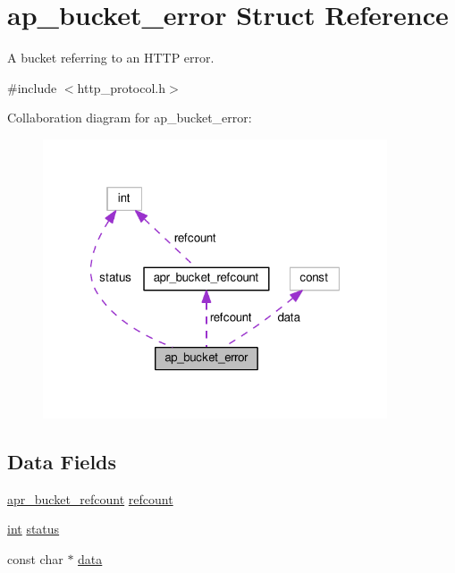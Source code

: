 \hypertarget{structap__bucket__error}{}\section{ap\+\_\+bucket\+\_\+error Struct Reference}
\label{structap__bucket__error}


A bucket referring to an H\+T\+TP error.  




{\ttfamily \#include $<$http\+\_\+protocol.\+h$>$}



Collaboration diagram for ap\+\_\+bucket\+\_\+error\+:
\nopagebreak
\begin{figure}[H]
\begin{center}
\leavevmode
\includegraphics[width=289pt]{structap__bucket__error__coll__graph}
\end{center}
\end{figure}
\subsection*{Data Fields}
\begin{DoxyCompactItemize}
\item 
\hyperlink{structapr__bucket__refcount}{apr\+\_\+bucket\+\_\+refcount} \hyperlink{structap__bucket__error_a4df3d73934d26dec62dd05312975bb53}{refcount}
\item 
\hyperlink{pcre_8txt_a42dfa4ff673c82d8efe7144098fbc198}{int} \hyperlink{structap__bucket__error_a7866fe685d7b0a09232731025c001976}{status}
\item 
const char $\ast$ \hyperlink{structap__bucket__error_a29a06548c68ecb88939c5ebb8b043826}{data}
\end{DoxyCompactItemize}


